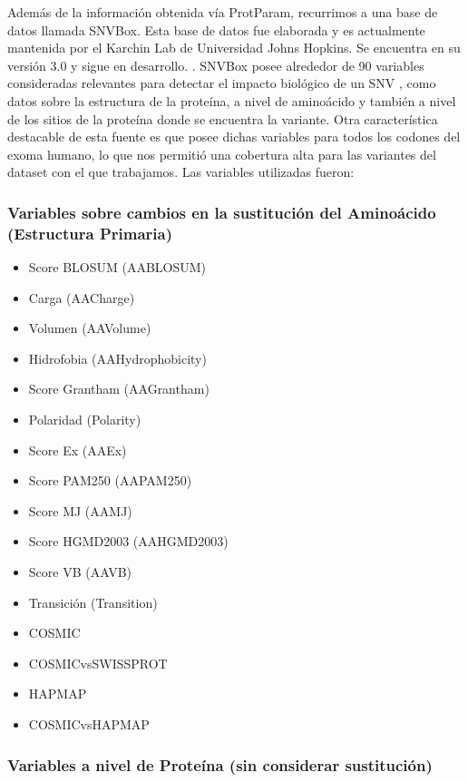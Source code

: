 Además de la información obtenida vía ProtParam, recurrimos a una base de datos llamada SNVBox. Esta base de datos fue elaborada y es actualmente mantenida por el Karchin Lab de Universidad Johns Hopkins. Se encuentra en su versión 3.0 y sigue en desarrollo. . SNVBox posee alrededor de 90 variables consideradas relevantes para detectar el impacto biológico de un SNV \cite{Wong2011}, como datos sobre la estructura de la proteína, a nivel de aminoácido y también a nivel de los sitios de la proteína donde se encuentra la variante. Otra característica destacable de esta fuente es que posee dichas variables para todos los codones del exoma humano, lo que nos permitió una cobertura alta para las variantes del dataset con el que trabajamos. Las variables utilizadas fueron:

\subsubsection{Variables sobre cambios en la sustitución del Aminoácido (Estructura Primaria)}
\begin{itemize}
    \item Score BLOSUM (AABLOSUM)
    \item Carga (AACharge)
    \item Volumen (AAVolume)
    \item Hidrofobia (AAHydrophobicity)
    \item Score Grantham (AAGrantham)
    \item Polaridad (Polarity)
    \item Score Ex (AAEx)
    \item Score PAM250 (AAPAM250)
    \item Score MJ (AAMJ)
    \item Score HGMD2003 (AAHGMD2003)
    \item Score VB (AAVB)
    \item Transición (Transition)
    \item COSMIC
    \item COSMICvsSWISSPROT
    \item HAPMAP
    \item COSMICvsHAPMAP
\end{itemize}

\subsubsection{Variables a nivel de Proteína (sin considerar sustitución)}


